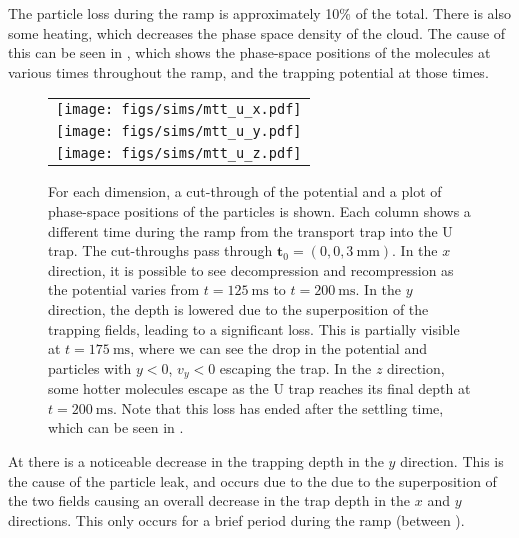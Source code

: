 
The particle loss during the ramp is approximately 10\% of the total. There is
also some heating, which decreases the phase space density of the cloud. The
cause of this can be seen in , which shows the
phase-space positions of the molecules at various times throughout the ramp,
and the trapping potential at those times.

\begin{figure}[p]
\centering
  \begin{tabular}{c}
    \texttt{[image: figs/sims/mtt\_u\_x.pdf]} \\
    \texttt{[image: figs/sims/mtt\_u\_y.pdf]} \\
    \texttt{[image: figs/sims/mtt\_u\_z.pdf]}
  \end{tabular}
  \caption{
    For each dimension, a cut-through of the potential and a plot of
    phase-space positions of the particles is shown. Each column shows a
    different time during the ramp from the transport trap into the U trap. The
    cut-throughs pass through $\mathbf{t}_0 = (0, 0, \SI{3}{\milli\meter})$. In
    the $x$ direction, it is possible to see decompression and recompression as
    the potential varies from $t=\SI{125}{\milli\second}$ to
    $t=\SI{200}{\milli\second}$. In the $y$ direction, the depth is lowered due
    to the superposition of the trapping fields, leading to a significant loss.
    This is partially visible at $t=\SI{175}{\milli\second}$, where we can see
    the drop in the potential and particles with $y<0$, $v_y<0$ escaping the
    trap. In the $z$ direction, some hotter molecules escape as the U trap
    reaches its final depth at $t=\SI{200}{\milli\second}$. Note that this loss
    has ended after the settling time, which can be seen in
    .
  }
  \label{design:fig:trans_U}
\end{figure}

At  there is a noticeable decrease in the trapping depth in the $y$
direction. This is the cause of the particle leak, and occurs due to the 
due to the superposition of the two fields causing an overall decrease in the
trap depth in the $x$ and $y$ directions. This only occurs for a brief period
during the ramp (between ). 

